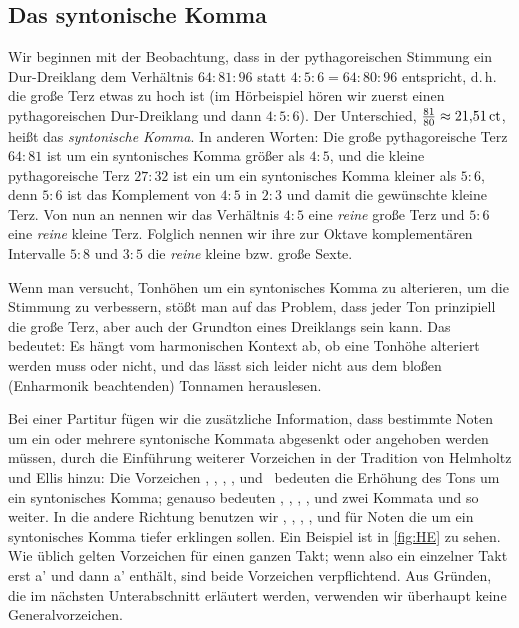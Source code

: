 
\subsection{Das syntonische Komma}

Wir beginnen mit der Beobachtung, dass in der pythagoreischen Stimmung ein
Dur-Dreiklang dem Verhältnis $64:81:96$ statt $4:5:6=64:80:96$ entspricht,
d.\,h. die große Terz etwas zu hoch ist (im Hörbeispiel hören wir zuerst einen
pythagoreischen Dur-Dreiklang und dann $4:5:6$). Der Unterschied,
$\frac{81}{80}\approx 21{,}51\,\mathrm{ct}$, heißt das \emph{syntonische
  Komma}. In anderen Worten:
Die große pythagoreische Terz $64:81$ ist um ein syntonisches Komma größer als
$4:5$, und die kleine pythagoreische Terz $27:32$ ist ein um ein syntonisches
Komma kleiner als $5:6$, denn $5:6$ ist das Komplement von $4:5$ in $2:3$ und
damit die gewünschte kleine Terz. Von nun an nennen wir das Verhältnis $4:5$
eine \emph{reine} große Terz und $5:6$ eine \emph{reine} kleine Terz. Folglich
nennen wir ihre zur Oktave komplementären Intervalle $5:8$ und $3:5$ die
\emph{reine} kleine bzw. große Sexte.

Wenn man versucht, Tonhöhen um ein syntonisches Komma zu alterieren, um die
Stimmung zu verbessern, stößt man auf das Problem, dass jeder Ton prinzipiell
die große Terz, aber auch der Grundton eines Dreiklangs sein kann. Das bedeutet:
Es hängt vom harmonischen Kontext ab, ob eine Tonhöhe alteriert werden muss
oder nicht, und das lässt sich leider nicht aus dem bloßen (Enharmonik
beachtenden) Tonnamen herauslesen.

Bei einer Partitur fügen wir die zusätzliche Information, dass bestimmte Noten
um ein oder mehrere syntonische Kommata abgesenkt oder angehoben werden müssen,
durch die Einführung weiterer Vorzeichen in der Tradition von Helmholtz und
Ellis \cite{HE} hinzu: Die Vorzeichen \dsharpp, \sharpp, \naturalp, \flatp, und
\dflatp\ bedeuten die Erhöhung des Tons um ein syntonisches Komma; genauso
bedeuten \dsharppp, \sharppp, \naturalpp, \flatpp, und \dflatpp zwei Kommata
und so weiter. In die andere Richtung benutzen wir \dsharpm, \sharpm, \naturalm,
\flatm, und \dflatm für Noten die um ein syntonisches Komma tiefer erklingen
sollen. Ein Beispiel ist in \cref{fig:HE} zu sehen. Wie üblich gelten Vorzeichen
für einen ganzen Takt; wenn also ein einzelner Takt erst \naturalm a' und dann
\natural a' enthält, sind beide Vorzeichen verpflichtend. Aus Gründen, die im
nächsten Unterabschnitt erläutert werden, verwenden wir überhaupt keine
Generalvorzeichen.

